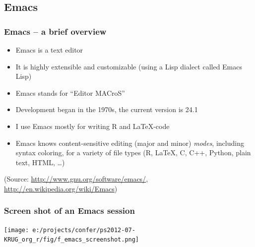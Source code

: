 \documentclass[bigger]{beamer}
\begin{document}
\subsection{Emacs}
\label{sec-2-2}
\begin{frame}
\frametitle{Emacs -- a brief overview}
\label{sec-2-2-1}

\begin{itemize}
\item Emacs is a text editor
\item It is highly extensible and customizable (using a Lisp dialect called Emacs Lisp)
\item Emacs stands for \enquote{Editor MACroS}
\item Development began in the 1970s, the current version is 24.1
\item I use Emacs mostly for writing R and \LaTeX-code
\item Emacs knows content-sensitive editing (major and minor) \emph{modes}, including syntax coloring, for
  a variety of file types (R, \LaTeX, C, C++, Python, plain text, HTML, \ldots{})
\end{itemize}

(Source: \href{http://www.gnu.org/software/emacs/}{http://www.gnu.org/software/emacs/}, \href{http://en.wikipedia.org/wiki/Emacs}{http://en.wikipedia.org/wiki/Emacs})
\end{frame}
\begin{frame}
\frametitle{Screen shot of an Emacs session}
\label{sec-2-2-2}


\texttt{[image: e:/projects/confer/ps2012-07-KRUG\_org\_r/fig/f\_emacs\_screenshot.png]}
\end{frame}
\end{document}
